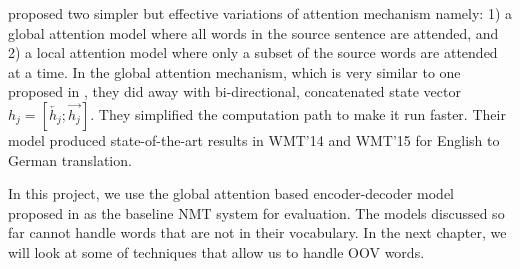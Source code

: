 
\cite{luong2015effective} proposed two simpler but effective variations of attention mechanism namely: 1) a global attention model where all words in the source sentence are attended, and 2) a local attention model where only a subset of the source words are attended at a time. In the global attention mechanism, which is very similar to one proposed in \cite{bahdanau2014neural}, they did away with bi-directional, concatenated state vector $h_j = [\overleftarrow{h_j};\overrightarrow{h_j}]$. They simplified the computation path to make it run faster. Their model produced state-of-the-art results in WMT'14 and WMT'15 for English to German translation. 


In this project, we use the global attention based encoder-decoder model proposed in \cite{luong2015effective} as the baseline NMT system for evaluation. The models discussed so far cannot handle words that are not in their vocabulary. In the next chapter, we will look at some of techniques that allow us to handle OOV words.





